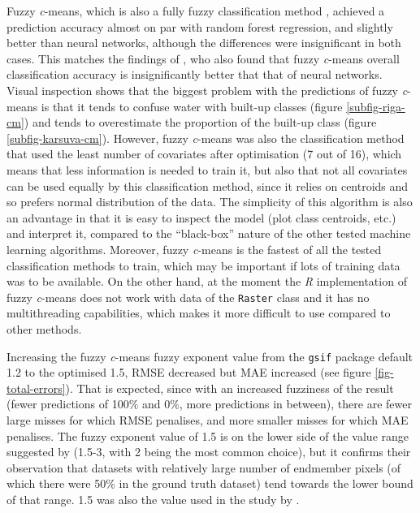 \documentclass[a4paper,12pt]{scrbook}
\begin{document}
Fuzzy \textit{c}-means, which is also a fully fuzzy classification method \citep{zhang2001fullyfuzzy}, achieved a prediction accuracy almost on par with random forest regression, and slightly better than neural networks, although the differences were insignificant in both cases. This matches the findings of \citet{zhang2001fullyfuzzy}, who also found that fuzzy \textit{c}-means overall classification accuracy is insignificantly better that that of neural networks. Visual inspection shows that the biggest problem with the predictions of fuzzy \textit{c}-means is that it tends to confuse water with built-up classes (figure \ref{subfig-riga-cm}) and tends to overestimate the proportion of the built-up class (figure \ref{subfig-karsuva-cm}). However, fuzzy \textit{c}-means was also the classification method that used the least number of covariates after optimisation (7 out of 16), which means that less information is needed to train it, but also that not all covariates can be used equally by this classification method, since it relies on centroids and so prefers normal distribution of the data. The simplicity of this algorithm is also an advantage in that it is easy to inspect the model (plot class centroids, etc.) and interpret it, compared to the ``black-box'' nature of the other tested machine learning algorithms. Moreover, fuzzy \textit{c}-means is the fastest of all the tested classification methods to train, which may be important if lots of training data was to be available. On the other hand, at the moment the \textit{R} implementation of fuzzy \textit{c}-means does not work with data of the \texttt{Raster} class and it has no multithreading capabilities, which makes it more difficult to use compared to other methods.


Increasing the fuzzy \textit{c}-means fuzzy exponent value from the \texttt{gsif} package default 1.2 to the optimised 1.5, RMSE decreased but MAE increased (see figure \ref{fig-total-errors}). That is expected, since with an increased fuzziness of the result (fewer predictions of 100\% and 0\%, more predictions in between), there are fewer large misses for which RMSE penalises, and more smaller misses for which MAE penalises. The fuzzy exponent value of 1.5 is on the lower side of the value range suggested by \citet{Okeke2006fuzzyexponent} (1.5-3, with 2 being the most common choice), but it confirms their observation that datasets with relatively large number of endmember pixels (of which there were 50\% in the ground truth dataset) tend towards the lower bound of that range. 1.5 was also the value used in the study by \citet{burrough2001fuzzy}.
\end{document}
